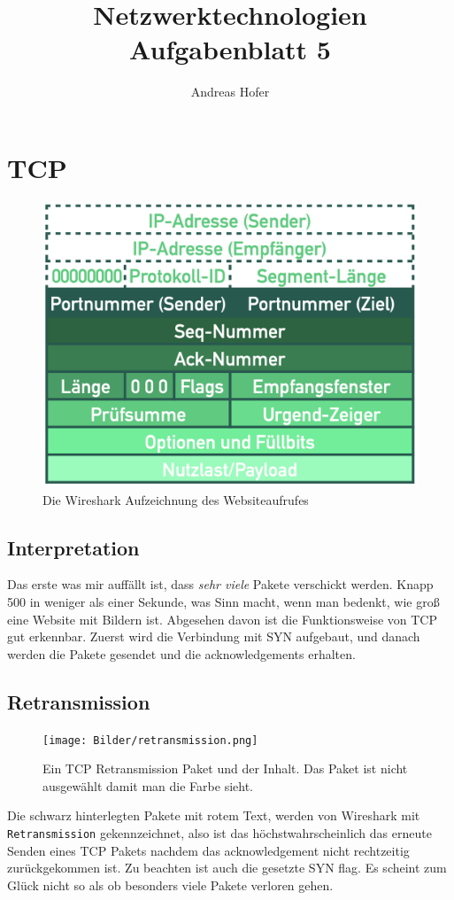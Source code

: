 \documentclass{article}
\title{\vspace{-1cm}Netzwerktechnologien Aufgabenblatt 5}
\author{Andreas Hofer}
\begin{document}
	\maketitle
	\section{TCP}
	\begin{figure}[H]
	\centering
	\includegraphics[scale=0.3]{Bilder/tcp.png}
	\caption{Die Wireshark Aufzeichnung des Websiteaufrufes}
	\end{figure}
	\addtocounter{subsection}{2}
	\subsection{Interpretation}
	Das erste was mir auffällt ist, dass \textit{sehr viele} Pakete verschickt werden. Knapp 500 in weniger als einer Sekunde, was Sinn macht, wenn man bedenkt, wie groß eine Website mit Bildern ist. Abgesehen davon ist die Funktionsweise von TCP gut erkennbar. Zuerst wird die Verbindung mit SYN aufgebaut, und danach werden die Pakete gesendet und die acknowledgements erhalten.
	\subsection{Retransmission}
	\begin{figure}[H]
	\centering
	\texttt{[image: Bilder/retransmission.png]}
	\caption{Ein TCP Retransmission Paket und der Inhalt. Das Paket ist nicht ausgewählt damit man die Farbe sieht.}
	\end{figure}
	Die schwarz hinterlegten Pakete mit rotem Text, werden von Wireshark mit \verb|Retransmission| gekennzeichnet, also ist das höchstwahrscheinlich das erneute Senden eines TCP Pakets nachdem das acknowledgement nicht rechtzeitig zurückgekommen ist. Zu beachten ist auch die gesetzte SYN flag. Es scheint zum Glück nicht so als ob besonders viele Pakete verloren gehen.
\end{document}
